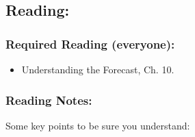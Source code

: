 \documentclass[
]{article}
\providecommand{\tightlist}{%
  \setlength{\itemsep}{0pt}\setlength{\parskip}{0pt}}
\begin{document}
\hypertarget{reading-11}{%
\subsection{Reading:}\label{reading-11}}

\hypertarget{required-reading-everyone-9}{%
\subsubsection{Required Reading
(everyone):}\label{required-reading-everyone-9}}

\begin{itemize}
\tightlist
\item
  Understanding the Forecast, Ch. 10.
\end{itemize}

\hypertarget{reading-notes-9}{%
\subsubsection{Reading Notes:}\label{reading-notes-9}}

Some key points to be sure you understand:
\end{document}
